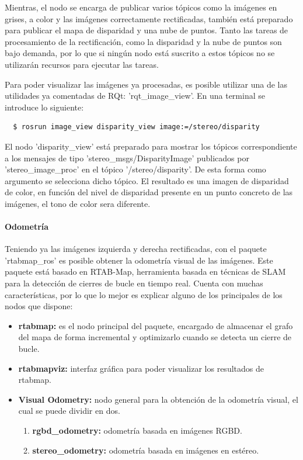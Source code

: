 Mientras, el nodo se encarga de publicar varios tópicos como la imágenes en
grises, a color y las imágenes correctamente rectificadas, también está
preparado para publicar el mapa de disparidad y una nube de puntos. Tanto las
tareas de procesamiento de la rectificación, como la disparidad y la nube de
puntos son bajo demanda, por lo que si ningún nodo está suscrito a estos tópicos
no se utilizarán recursos para ejecutar las tareas.

Para poder visualizar las imágenes ya procesadas, es posible utilizar una de las
utilidades ya comentadas de RQt: 'rqt\_image\_view'. En una terminal se
introduce lo siguiente:
\\
\begin{lstlisting}
  $ rosrun image_view disparity_view image:=/stereo/disparity
\end{lstlisting}

El nodo 'disparity\_view' está preparado para mostrar los tópicos
correspondiente a los mensajes de tipo 'stereo\_msgs/DisparityImage' publicados
por 'stereo\_image\_proc' en el tópico '/stereo/disparity'. De esta forma como
argumento se selecciona dicho tópico. El resultado es una imagen de disparidad
de color, en función del nivel de disparidad presente en un punto concreto de
las imágenes, el tono de color sera diferente.

\paragraph{Odometría} \hspace{0pt}

Teniendo ya las imágenes izquierda y derecha rectificadas, con el paquete
'rtabmap\_ros' es posible obtener la odometría visual de las imágenes. Este
paquete está basado en RTAB-Map, herramienta basada en técnicas de SLAM para la
detección de cierres de bucle en tiempo real. Cuenta con muchas características,
por lo que lo mejor es explicar alguno de los principales de los nodos que
dispone:

\begin{itemize}
  \item \textbf{rtabmap:} es el nodo principal del paquete, encargado de
  almacenar el grafo del mapa de forma incremental y optimizarlo cuando se
  detecta un cierre de bucle.
  \item \textbf{rtabmapviz:} interfaz gráfica para poder visualizar los
  resultados de rtabmap.
  \item \textbf{Visual Odometry:} nodo general para la obtención de la odometría
  visual, el cual se puede dividir en dos.
  \begin{enumerate}
    \item \textbf{rgbd\_odometry:} odometría basada en imágenes RGBD.
    \item \textbf{stereo\_odometry:} odometría basada en imágenes en estéreo.
  \end{enumerate}
\end{itemize}

